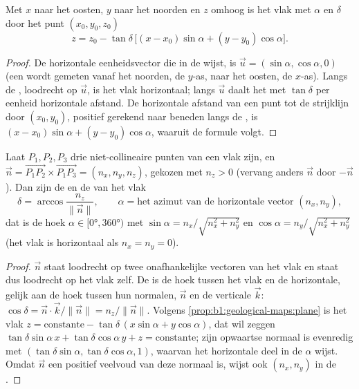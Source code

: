 \begin{proposition}\label{prop:b1:geological-maps:plane}
Met $x$ naar het oosten, $y$ naar het noorden en $z$ omhoog is het vlak met 
$\alpha$ en  $\delta$ door het punt $(x_0, y_0, z_0)$
\[
  z = z_0 - \tan\delta\,\bigl[(x - x_0)\sin\alpha + (y - y_0)\cos\alpha\bigr].
\]
\end{proposition}

\begin{proof}
De horizontale eenheidsvector die in de  wijst, is
$\vec u = (\sin\alpha, \cos\alpha, 0)$ (een  wordt gemeten vanaf het noorden, de $y$-as,
naar het oosten, de $x$-as). Langs de , loodrecht op $\vec u$, is het vlak horizontaal;
langs $\vec u$ daalt het met $\tan\delta$ per eenheid horizontale afstand. De horizontale afstand
van een punt tot de strijklijn door $(x_0, y_0)$, positief gerekend naar beneden langs de ,
is $(x-x_0)\sin\alpha + (y-y_0)\cos\alpha$, waaruit de formule volgt.
\end{proof}

\begin{theorem}\label{thm:b1:geological-maps:three-point}
Laat $P_1, P_2, P_3$ drie niet-collineaire punten van een vlak zijn, en
$\vec n = \overrightarrow{P_1P_2} \times \overrightarrow{P_1P_3} =
(n_x, n_y, n_z)$, gekozen met $n_z > 0$ (vervang anders $\vec n$ door $-\vec n$).
Dan zijn de  en de  van het vlak
\[
  \delta = \arccos\frac{n_z}{\|\vec n\|}, \qquad
  \alpha = \text{het azimut van de horizontale vector } (n_x, n_y),
\]
dat is de hoek $\alpha \in [\ang{0}, \ang{360})$ met
$\sin\alpha = n_x/\sqrt{n_x^2+n_y^2}$ en $\cos\alpha = n_y/\sqrt{n_x^2+n_y^2}$
(het vlak is horizontaal als $n_x = n_y = 0$).
\end{theorem}

\begin{proof}
$\vec n$ staat loodrecht op twee onafhankelijke vectoren van het vlak en staat dus loodrecht op het vlak zelf.
De  is de hoek tussen het vlak en de horizontale, gelijk aan de hoek tussen hun normalen,
$\vec n$ en de verticale $\vec k$: $\cos\delta = \vec n \cdot \vec k / \|\vec n\| = n_z/\|\vec n\|$.
Volgens \cref{prop:b1:geological-maps:plane} is het vlak $z = \text{constante} -
\tan\delta\,(x\sin\alpha + y\cos\alpha)$, dat wil zeggen
$\tan\delta\sin\alpha\,x + \tan\delta\cos\alpha\,y + z = \text{constante}$; zijn
opwaartse normaal is evenredig met $(\tan\delta\sin\alpha,
\tan\delta\cos\alpha, 1)$, waarvan het horizontale deel in de  $\alpha$ wijst.
Omdat $\vec n$ een positief veelvoud van deze normaal is, wijst ook $(n_x, n_y)$ in de .
\end{proof}

